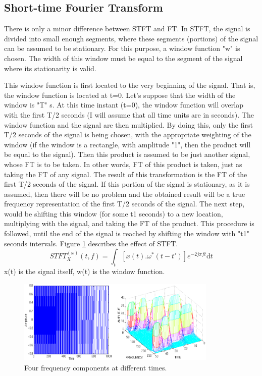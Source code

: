 \documentclass[12pt, a4paper, twoside]{report}
\begin{document}
\subsection{Short-time Fourier Transform}
There is only a minor difference between STFT and FT. In STFT, the signal is divided into small enough segments, where these segments (portions) of the signal can be assumed to be stationary. For this purpose, a window function "w" is chosen. The width of this window must be equal to the segment of the signal where its stationarity is valid.
\par
This window function is first located to the very beginning of the signal. That is, the window function is located at t=0. Let's suppose that the width of the window is "T" s. At this time instant (t=0), the window function will overlap with the first T/2 seconds (I will assume that all time units are in seconds). The window function and the signal are then multiplied. By doing this, only the first T/2 seconds of the signal is being chosen, with the appropriate weighting of the window (if the window is a rectangle, with amplitude "1", then the product will be equal to the signal). Then this product is assumed to be just another signal, whose FT is to be taken. In other words, FT of this product is taken, just as taking the FT of any signal. 
The result of this transformation is the FT of the first T/2 seconds of the signal. If this portion of the signal is stationary, as it is assumed, then there will be no problem and the obtained result will be a true frequency representation of the first T/2 seconds of the signal. 
The next step, would be shifting this window (for some t1 seconds) to a new location, multiplying with the signal, and taking the FT of the product. This procedure is followed, until the end of the signal is reached by shifting the window with "t1" seconds intervals. Figure \ref{fig:dwt-stft1} describes the effect of STFT.
\begin{equation}
STFT^{(\omega)}_{X}(t, f) = \int_{t}\left [ x(t) . \omega^{*}(t-t')  \right ] e^{-2j\pi ft} \text{d}t
\end{equation}
x(t) is the signal itself, w(t) is the window function.
\begin{figure}[!h]
	\centering
	\includegraphics[width=0.85\textwidth]
	{images/chapter3/dwt-stft1}
	\caption{Four frequency components at different times.}
	\label{fig:dwt-stft1}
\end{figure}
\end{document}
